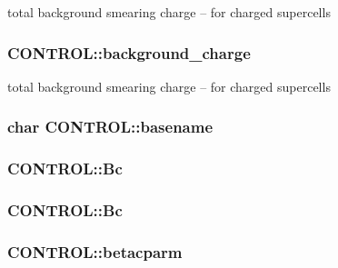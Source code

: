 total background smearing charge -- for charged supercells \hypertarget{struct_c_o_n_t_r_o_l_ae2a04a632816b5d23f09770dda697f65}{
\subsubsection[{background\-\_\-charge}]{ C\-O\-N\-T\-R\-O\-L\-::background\-\_\-charge}}\label{struct_c_o_n_t_r_o_l_ae2a04a632816b5d23f09770dda697f65}
total background smearing charge -- for charged supercells \hypertarget{struct_c_o_n_t_r_o_l_a706f1d5c4d7a33d43f8340bd581214f9}{
\subsubsection[{basename}]{\setlength{\rightskip}{0pt plus 5cm}char C\-O\-N\-T\-R\-O\-L\-::basename}}\label{struct_c_o_n_t_r_o_l_a706f1d5c4d7a33d43f8340bd581214f9}
\hypertarget{struct_c_o_n_t_r_o_l_a231b29e8aa17ca24d398be11215c5334}{
\subsubsection[{Bc}]{ C\-O\-N\-T\-R\-O\-L\-::\-Bc}}\label{struct_c_o_n_t_r_o_l_a231b29e8aa17ca24d398be11215c5334}
\hypertarget{struct_c_o_n_t_r_o_l_a7b78d2b9d2565ca420cd9fb1ac805141}{
\subsubsection[{Bc}]{ C\-O\-N\-T\-R\-O\-L\-::\-Bc}}\label{struct_c_o_n_t_r_o_l_a7b78d2b9d2565ca420cd9fb1ac805141}
\hypertarget{struct_c_o_n_t_r_o_l_ac105e71492817a9b5a45c62528f8ad02}{
\subsubsection[{betacparm}]{ C\-O\-N\-T\-R\-O\-L\-::betacparm}}\label{struct_c_o_n_t_r_o_l_ac105e71492817a9b5a45c62528f8ad02}
